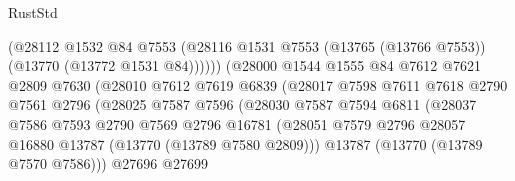 \begin{lexlean}{RustStd}
\begin{coremodule}
                                      (@28112
                                        @1532
                                        @84
                                        @7553
                                        (@28116
                                          @1531
                                          @7553
                                          (@13765 (@13766 @7553))
                                          (@13770 (@13772 @1531 @84))))))
                                  (@28000
                                    @1544
                                    @1555
                                    @84
                                    @7612
                                    @7621
                                    @2809
                                    @7630
                                    (@28010
                                      @7612
                                      @7619
                                      @6839
                                      (@28017
                                        @7598
                                        @7611
                                        @7618
                                        @2790
                                        @7561
                                        @2796
                                        (@28025
                                          @7587
                                          @7596
                                          (@28030
                                            @7587
                                            @7594
                                            @6811
                                            (@28037
                                              @7586
                                              @7593
                                              @2790
                                              @7569
                                              @2796
                                              @16781
                                              (@28051
                                                @7579
                                                @2796
                                                @28057
                                                @16880
                                                @13787
                                                (@13770 (@13789 @7580 @2809)))
                                              @13787
                                              (@13770 (@13789 @7570 @7586)))
                                            @27696
                                            @27699

\end{coremodule}
\end{lexlean}
